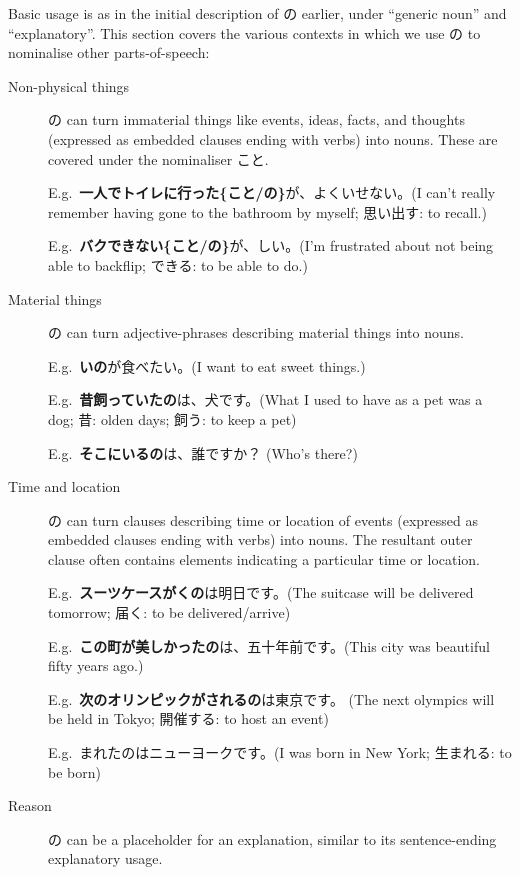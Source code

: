 \documentclass[../nihongo-gakushuu-kyouzai.tex]{subfiles}
\begin{document}
Basic usage is as in the initial description of の earlier, under ``generic noun'' and ``explanatory''. This section covers the various contexts in which we use の to nominalise other parts-of-speech:
\begin{description}
    \item[Non-physical things] の can turn immaterial things like events, ideas, facts, and thoughts (expressed as embedded clauses ending with verbs) into nouns. These are covered under the nominaliser こと.

    E.g.\ \textbf{一人でトイレに行った\{こと/の\}}が、よくいせない。(I can't really remember having gone to the bathroom by myself; 思い出す: to recall.)

    E.g.\ \textbf{バクできない\{こと/の\}}が、しい。(I'm frustrated about not being able to backflip; できる: to be able to do.)

    \item[Material things] の can turn adjective-phrases describing material things into nouns.

    E.g.\ \textbf{いの}が食べたい。(I want to eat sweet things.)

    E.g.\ \textbf{昔飼っていたの}は、犬です。(What I used to have as a pet was a dog; 昔: olden days; 飼う: to keep a pet)

    E.g.\ \textbf{そこにいるの}は、誰ですか？ (Who's there?)

    \item[Time and location] の can turn clauses describing time or location of events (expressed as embedded clauses ending with verbs) into nouns. The resultant outer clause often contains elements indicating a particular time or location.

    E.g.\ \textbf{スーツケースがくの}は明日です。(The suitcase will be delivered tomorrow; 届く: to be delivered/arrive)

    E.g.\ \textbf{この町が美しかったの}は、五十年前です。(This city was beautiful fifty years ago.)

    E.g.\ \textbf{次のオリンピックがされるの}は東京です。 (The next olympics will be held in Tokyo; 開催する: to host an event)

    E.g.\ まれたのはニューヨークです。(I was born in New York; 生まれる: to be born)

    \item[Reason] の can be a placeholder for an explanation, similar to its sentence-ending explanatory usage.


\end{description}
\end{document}
